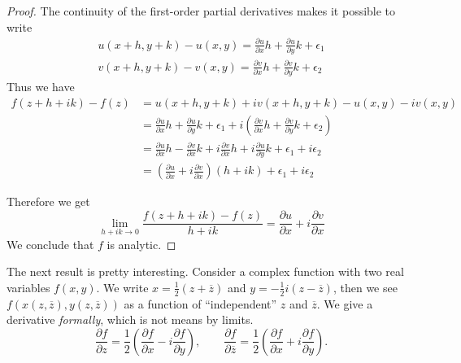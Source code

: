 \documentclass[../main.tex]{subfiles}
\begin{document}
\begin{proof}
The continuity of the first-order partial derivatives makes it possible to write
\begin{equation*}
\begin{aligned}
u(x+h,y+k)-u(x,y) = \frac{\partial u}{\partial x}h + \frac{\partial u}{\partial y}k + \epsilon_1\\
v(x+h,y+k)-v(x,y) = \frac{\partial v}{\partial x}h + \frac{\partial v}{\partial y}k + \epsilon_2
\end{aligned}
\end{equation*}
Thus we have
\begin{equation*}
\begin{aligned}
	f(z+h+ik)-f(z) &= u(x+h,y+k) + iv(x+h,y+k) - u(x,y) - iv(x,y)\\
		       &= \frac{\partial u}{\partial x}h + \frac{\partial u}{\partial y}k + \epsilon_1 + i \left(\frac{\partial v}{\partial x}h + \frac{\partial v}{\partial y}k + \epsilon_2\right)\\
		       &= \frac{\partial u}{\partial x}h - \frac{\partial v}{\partial x}k + i \frac{\partial v}{\partial x}h + i \frac{\partial u}{\partial y}k + \epsilon_1+i \epsilon_2\\
		       &= \left(\frac{\partial u}{\partial x}+ i \frac{\partial v}{\partial x}\right)\left(h+ik\right) + \epsilon_1 + i \epsilon_2
\end{aligned}
\end{equation*}

Therefore we get 
\begin{equation*}
\lim_{h+ik \to 0} \frac{f(z+h+ik)-f(z)}{h+ik} = \frac{\partial u}{\partial x} + i \frac{\partial v}{\partial x}
\end{equation*}
We conclude that  $f$ is analytic.
\end{proof}

The next result is pretty interesting. Consider a complex function with two real variables $f(x,y)$. We write $x = \frac{1}{2}(z+\overline{z})$ and $y = -\frac{1}{2}i(z-\overline{z})$, then we see $f(x(z,\overline{z}),y(z,\overline{z}))$ as a function of ``independent'' $z$ and $\overline{z}$. We give a derivative \emph{formally}, which is not means by limits.
\begin{equation}
	\frac{\partial f}{\partial z} = \frac{1}{2} \left(\frac{\partial f}{\partial x}-i \frac{\partial f}{\partial y}\right), \qquad \frac{\partial f}{\partial \overline{z}} = \frac{1}{2}\left(\frac{\partial f}{\partial x} + i \frac{\partial f}{\partial y}\right).
\end{equation}
\end{document}
